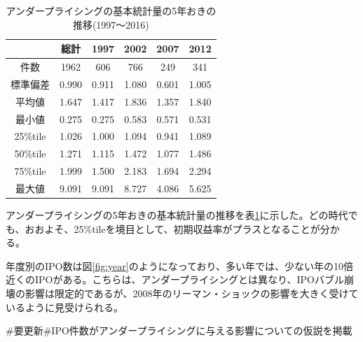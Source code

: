 \documentclass{jsarticle}
\begin{document}
\begin{table}[h]
  \begin{center}
  \caption{アンダープライシングの基本統計量の5年おきの推移(1997〜2016)}
\begin{tabular*}{120mm}{@{\extracolsep{\fill}}c|ccccc}

\hline
\  & 総計 &  1997 &  2002&   2007  & 2012 \\
\hline \hline
件数 &1962 & 606 & 766 & 249 & 341 \\
\hline
標準偏差&       0.990  &0.911  &1.080 & 0.601 & 1.005 \\
\hline
平均値   &  1.647 & 1.417 & 1.836 & 1.357 & 1.840 \\
\hline
最小値    &     0.275 & 0.275 & 0.583 & 0.571&  0.531 \\
25\%tile   &       1.026 & 1.000  &1.094 & 0.941 & 1.089 \\
50\%tile    &      1.271&  1.115 & 1.472 & 1.077  &1.486 \\
75\%tile     &     1.999 & 1.500 & 2.183  &1.694 & 2.294 \\
最大値  &   9.091 & 9.091&  8.727 & 4.086 & 5.625 \\
\hline
	\end{tabular*}
	\label{stats} 
  \end{center}
\end{table}

アンダープライシングの5年おきの基本統計量の推移を表\ref{stats}に示した。どの時代でも、おおよそ、25\%tileを境目として、初期収益率がプラスとなることが分かる。\par


年度別のIPO数は図\ref{fig:year}のようになっており、多い年では、少ない年の10倍近くのIPOがある。こちらは、アンダープライシングとは異なり、IPOバブル崩壊の影響は限定的であるが、2008年のリーマン・ショックの影響を大きく受けているように見受けられる。

\#要更新\#IPO件数がアンダープライシングに与える影響についての仮説を掲載
\end{document}
